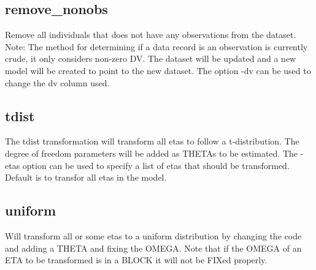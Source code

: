 \subsection{remove\_nonobs}
Remove all individuals that does not have any observations from the dataset. Note: The method for determining if a data record is an observation is currently crude, it only considers non-zero DV. The dataset will be updated and a new model will be created to point to the new dataset. The option -dv can be used to
change the dv column used.


\subsection{tdist}
The tdist transformation will transform all etas to follow a t-distribution. The degree of freedom parameters will be added as THETAs to be estimated. The -etas option can be used to specify a list of etas that should be transformed. Default is to transfor all etas in the model.

\subsection{uniform}
Will transform all or some etas to a uniform distribution by changing the code and adding a THETA and fixing the OMEGA. Note that if the OMEGA of an ETA to be transformed is in a BLOCK it will not be FIXed properly.


